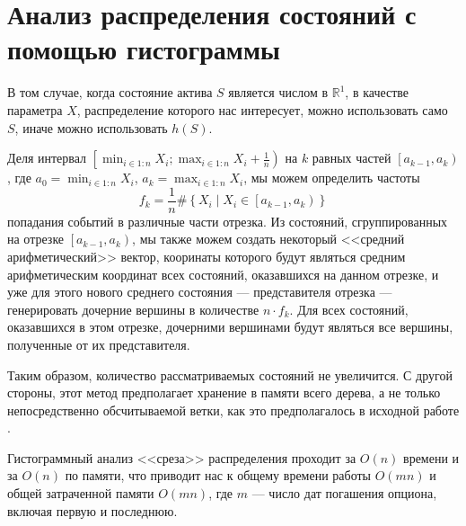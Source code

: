 \documentclass[specialist,
               substylefile = spbu.rtx,
               subf,href,colorlinks=true, 12pt]{disser}
\newcommand{\R}{\ensuremath{\mathbb{R}}}
\begin{document}
	\section{Анализ распределения состояний с помощью гистограммы}
		\par В том случае, когда состояние актива $S$ является числом в $\R ^1$, в качестве параметра $X$, распределение которого нас интересует, можно использовать  само $S$, иначе можно использовать $h(S)$. 
		\par Деля интервал $\left[\min_{i\in 1:n} X_i ; \max_{i\in 1:n} X_i + \frac{1}{n}\right)$ на $k$ равных частей $\left[a_{k-1},a_k\right)$, где $a_0 = \min_{i\in 1:n} X_i$, $a_k = \max_{i\in 1:n} X_i$, мы можем определить частоты \[f_k = \frac{1}{n}\#\left\lbrace X_i \middle\vert X_i\in\left[a_{k-1},a_k\right)\right\rbrace\] попадания событий в различные части отрезка. Из состояний, сгруппированных на отрезке $\left[a_{k-1},a_k\right)$, мы также можем создать некоторый <<средний арифметический>> вектор, кооринаты которого будут являться средним арифметическим координат всех состояний, оказавшихся на данном отрезке, и уже для этого нового среднего состояния --- представителя отрезка --- генерировать дочерние вершины в количестве $n\cdot f_k$. Для всех состояний, оказавшихся в этом отрезке, дочерними вершинами будут являться все вершины, полученные от их представителя. 
		\par Таким образом, количество рассматриваемых состояний не увеличится. С другой стороны, этот метод предполагает хранение в памяти всего дерева, а не только непосредственно обсчитываемой ветки, как это предполагалось в исходной работе \cite{Broadie1997}.
		\par Гистограммный анализ <<среза>> распределения проходит за $O\left(n\right)$ времени и за $O\left(n\right)$ по памяти, что приводит нас к общему времени работы $O\left(mn\right)$ и общей затраченной памяти $O\left(mn\right)$, где $m$ --- число дат погашения опциона, включая первую и последнюю.
\end{document}
